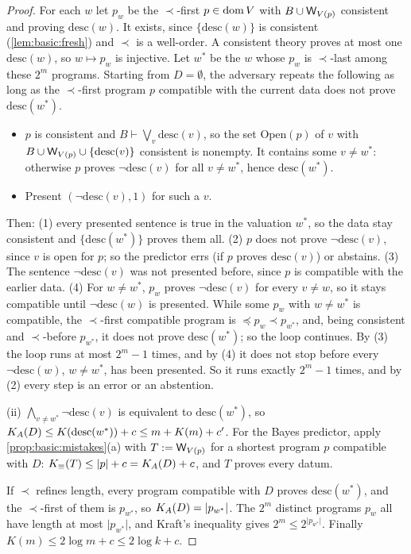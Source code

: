 \begin{proof}
For each $w$ let $p_w$ be the $\prec$-first $p\in\operatorname{dom} V$ with $B\cup\mathsf{W}_{V(p)}$ consistent and proving $\mathrm{desc}(w)$. It exists, since $\{\mathrm{desc}(w)\}$ is consistent (\cref{lem:basic:fresh}) and $\prec$ is a well-order. A consistent theory proves at most one $\mathrm{desc}(w)$, so $w\mapsto p_w$ is injective. Let $w^*$ be the $w$ whose $p_w$ is $\prec$-last among these $2^m$ programs. Starting from $D=\emptyset$, the adversary repeats the following as long as the $\prec$-first program $p$ compatible with the current data does not prove $\mathrm{desc}(w^*)$.
\begin{itemize}[leftmargin=*]
\item $p$ is consistent and $B\vdash\bigvee_v\mathrm{desc}(v)$, so the set $\mathrm{Open}(p)$ of $v$ with $B\cup\mathsf{W}_{V(p)}\cup\{\mathrm{desc}(v)\}$ consistent is nonempty. It contains some $v\ne w^*$: otherwise $p$ proves $\neg\mathrm{desc}(v)$ for all $v\ne w^*$, hence $\mathrm{desc}(w^*)$.
\item Present $(\neg\mathrm{desc}(v),1)$ for such a $v$.
\end{itemize}
Then: (1) every presented sentence is true in the valuation $w^*$, so the data stay consistent and $\{\mathrm{desc}(w^*)\}$ proves them all. (2) $p$ does not prove $\neg\mathrm{desc}(v)$, since $v$ is open for $p$; so the predictor errs (if $p$ proves $\mathrm{desc}(v)$) or abstains. (3) The sentence $\neg\mathrm{desc}(v)$ was not presented before, since $p$ is compatible with the earlier data. (4) For $w\ne w^*$, $p_w$ proves $\neg\mathrm{desc}(v)$ for every $v\ne w$, so it stays compatible until $\neg\mathrm{desc}(w)$ is presented. While some $p_w$ with $w\ne w^*$ is compatible, the $\prec$-first compatible program is $\preceq p_w\prec p_{w^*}$, and, being consistent and $\prec$-before $p_{w^*}$, it does not prove $\mathrm{desc}(w^*)$; so the loop continues. By (3) the loop runs at most $2^m-1$ times, and by (4) it does not stop before every $\neg\mathrm{desc}(w)$, $w\ne w^*$, has been presented. So it runs exactly $2^m-1$ times, and by (2) every step is an error or an abstention.

(ii) $\bigwedge_{v\ne w^*}\neg\mathrm{desc}(v)$ is equivalent to $\mathrm{desc}(w^*)$, so $K_{A}(D)\le K(\mathrm{desc}(w^*))+c\le m+K(m)+c'$. For the Bayes predictor, apply \cref{prop:basic:mistakes}(a) with $T:=\mathsf{W}_{V(p)}$ for a shortest program $p$ compatible with $D$: $K_{\equiv}(T)\le\lvert p\rvert+c=K_{A}(D)+c$, and $T$ proves every datum.

If $\prec$ refines length, every program compatible with $D$ proves $\mathrm{desc}(w^*)$, and the $\prec$-first of them is $p_{w^*}$, so $K_{A}(D)=\lvert p_{w^*}\rvert$. The $2^m$ distinct programs $p_w$ all have length at most $\lvert p_{w^*}\rvert$, and Kraft's inequality gives $2^m\le2^{\lvert p_{w^*}\rvert}$. Finally $K(m)\le2\log m+c\le2\log k+c$.
\end{proof}

